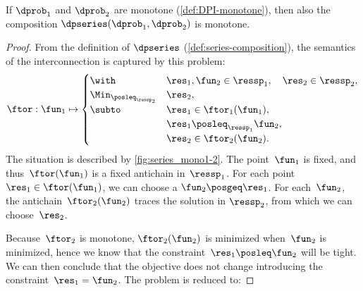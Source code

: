 \begin{proposition}
  \label{pro:series-monotone}If $\dprob_{1}$ and $\dprob_{2}$ are
  monotone (\cref{def:DPI-monotone}), then also the composition $\dpseries(\dprob_{1},\dprob_{2})$
  is monotone.
\end{proposition}
\begin{proof}
  From the definition of $\dpseries$ (\cref{def:series-composition}),
  the semantics of the interconnection is captured by this problem:
  \begin{equation}
    \ftor:\fun_{1}\mapsto\begin{cases}
                           \with & \res_{1},\fun_{2}\in\ressp_{1},\quad\res_{2}\in\ressp_{2},\\
                           \Min_{\posleq_{\ressp_{2}}} & \res_{2},\\
                           \subto & \res_{1}\in\ftor_{1}(\fun_{1}),\\
                           & \res_{1}\posleq_{\ressp_{1}}\fun_{2},\\
                           & \res_{2}\in\ftor_{2}(\fun_{2}).
    \end{cases}\label{eq:dede}
  \end{equation}
  The situation is described by \cref{fig:series_mono1-2}. The point~$\fun_{1}$
  is fixed, and thus~$\ftor(\fun_{1})$ is a fixed antichain in~$\ressp_{1}$.
  For each point $\res_{1}\in\ftor(\fun_{1})$, we can choose a $\fun_{2}\posgeq\res_{1}$.
  For each~$\fun_{2}$, the antichain~$\ftor_{2}(\fun_{2})$ traces
  the solution in $\ressp_{2}$, from which we can choose~$\res_{2}$.


  \noindent Because~$\ftor_{2}$ is monotone, $\ftor_{2}(\fun_{2})$
  is minimized when~$\fun_{2}$ is minimized, hence we know that the
  constraint~$\res_{1}\posleq\fun_{2}$ will be tight. We can then
  conclude that the objective does not change introducing the constraint~$\res_{1}=\fun_{2}$.
  The problem is reduced to:


\end{proof}
